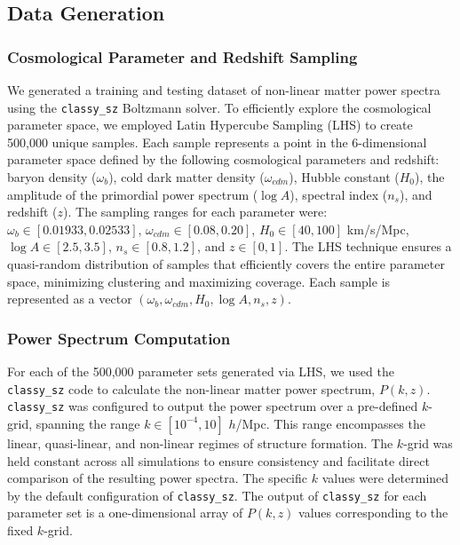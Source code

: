 \documentclass[twocolumn]{aastex631}
\begin{document}
\subsection{Data Generation}

\subsubsection{Cosmological Parameter and Redshift Sampling}

We generated a training and testing dataset of non-linear matter power spectra using the \texttt{classy\_sz} Boltzmann solver. To efficiently explore the cosmological parameter space, we employed Latin Hypercube Sampling (LHS) to create 500,000 unique samples. Each sample represents a point in the 6-dimensional parameter space defined by the following cosmological parameters and redshift: baryon density ($\omega_b$), cold dark matter density ($\omega_{cdm}$), Hubble constant ($H_0$), the amplitude of the primordial power spectrum ($\log A$), spectral index ($n_s$), and redshift ($z$). The sampling ranges for each parameter were: $\omega_b \in [0.01933, 0.02533]$, $\omega_{cdm} \in [0.08, 0.20]$, $H_0 \in [40, 100]$ km/s/Mpc, $\log A \in [2.5, 3.5]$, $n_s \in [0.8, 1.2]$, and $z \in [0, 1]$. The LHS technique ensures a quasi-random distribution of samples that efficiently covers the entire parameter space, minimizing clustering and maximizing coverage. Each sample is represented as a vector $(\omega_b, \omega_{cdm}, H_0, \log A, n_s, z)$.

\subsubsection{Power Spectrum Computation}

For each of the 500,000 parameter sets generated via LHS, we used the \texttt{classy\_sz} code to calculate the non-linear matter power spectrum, $P(k, z)$. \texttt{classy\_sz} was configured to output the power spectrum over a pre-defined $k$-grid, spanning the range $k \in [10^{-4}, 10]$ $h$/Mpc. This range encompasses the linear, quasi-linear, and non-linear regimes of structure formation. The $k$-grid was held constant across all simulations to ensure consistency and facilitate direct comparison of the resulting power spectra. The specific $k$ values were determined by the default configuration of \texttt{classy\_sz}. The output of \texttt{classy\_sz} for each parameter set is a one-dimensional array of $P(k, z)$ values corresponding to the fixed $k$-grid.
\end{document}
